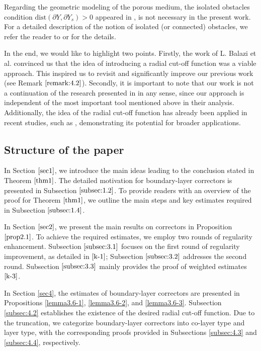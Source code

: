 \documentclass[13pt,CJK]{article}
\theoremstyle{plain}                       %
\theoremstyle{remark}
\numberwithin{equation}{section}
\begin{document}
Regarding the geometric modeling of the porous medium, the isolated obstacles condition $\text{dist}(\partial Y,\partial Y_s) > 0$ appeared in \cite{Shen20}, is not necessary in the present work.  For a detailed description of the notion of isolated (or connected) obstacles, we refer the reader to \cite[Section 2]{Balazi-Allaire-Omnes24} or
\cite[Section 14]{Chechkin-Piatnitski-Shamaev2007} for the details.



In the end, we would like to highlight two points. Firstly, the work of L. Balazi et al. \cite{Balazi-Allaire-Omnes24,Jankowiak-Lozinski24} convinced us that the idea of introducing a radial cut-off function was a viable approach. This inspired us to revisit and significantly improve our previous work \cite{Wang-Xu-Zhang22} (see Remark $\ref{remark:4.2}$). Secondly, it is important to note that our work is not a continuation of the research presented in  \cite{Balazi-Allaire-Omnes24,Jankowiak-Lozinski24,Shen20}
in any sense,
since our approach is independent of the most important tool mentioned above in their analysis. Additionally, the idea of the radial cut-off function has already been applied in recent studies, such as \cite{Jing-Lu-Prange24},
demonstrating its potential for broader applications.


\subsection{\centering Structure of the paper}

In Section $\ref{sec1}$, we introduce the main ideas leading to the conclusion stated in Theorem $\ref{thm1}$. The detailed motivation for boundary-layer correctors is presented in Subsection $\ref{subsec:1.2}$. To provide readers with an overview of the proof for Theorem $\ref{thm1}$, we outline the main steps and key estimates required in Subsection $\ref{subsec:1.4}$.

In Section $\ref{sec2}$, we present the main results on correctors in Proposition $\ref{prop2.1}$. To achieve the required estimates, we employ two rounds of regularity enhancement. Subsection $\ref{subsec:3.1}$ focuses on the first round of regularity improvement, as detailed in $\eqref{k-1}$; Subsection $\ref{subsec:3.2}$ addresses the second round. Subsection $\ref{subsec:3.3}$ mainly provides the proof of weighted estimates $\eqref{k-3}$.

In Section \ref{sec4}, the estimates of boundary-layer correctors are presented in Propositions \ref{lemma3.6-1}, \ref{lemma3.6-2}, and \ref{lemma3.6-3}. Subsection \ref{subsec:4.2} establishes the existence of the desired radial cut-off function. Due to the truncation, we categorize boundary-layer correctors into co-layer type and layer type, with the corresponding proofs provided in Subsections \ref{subsec:4.3} and \ref{subsec:4.4}, respectively.
\end{document}

